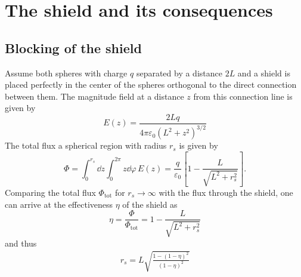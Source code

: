 \chapter{The shield and its consequences}

\section{Blocking of the shield}\label{apx:blocking-of-the-shield}
Assume both spheres with charge $q$ separated by a distance $2L$ and a shield is placed perfectly in the center of the spheres orthogonal to the direct connection between them. The magnitude field at a distance $z$ from this connection line is given by 
\begin{equation}
  E(z) = \frac{2Lq}{4\pi\varepsilon_0 (L^2 + z^2)^{3/2}}
\end{equation}
The total flux a spherical region with radius $r_s$ is given by
\begin{equation}
  \Phi = \int_{0}^{r_s}\dd z \int_{0}^{2\pi} z \dd \varphi \, E(z) = \frac{q}{\varepsilon_0} \left[ 1 - \frac{L}{\sqrt{L^2 + r_s^2}} \right] .
\end{equation}
Comparing the total flux $\Phi_\mathrm{tot}$ for $r_s \rightarrow \infty$ with the flux through the shield, one can arrive at the effectiveness $\eta$ of the shield as
\begin{equation}
  \eta = \frac{\Phi}{\Phi_\mathrm{tot}} = 1 - \frac{L}{\sqrt{L^2 + r_s^2}}
\end{equation}
and thus
\begin{eqnarray}
  r_s = L \sqrt{\frac{1 - (1-\eta)^2}{(1-\eta)^2}}
\end{eqnarray}

